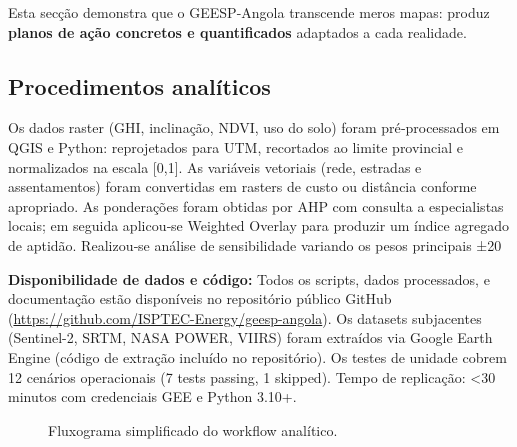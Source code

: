 \documentclass[12pt, a4paper]{article}
\begin{document}
Esta secção demonstra que o GEESP-Angola transcende meros mapas: produz 
\textbf{planos de ação concretos e quantificados} adaptados a cada realidade.

\subsection{Procedimentos analíticos}

Os dados raster (GHI, inclinação, NDVI, uso do solo) foram pré‑processados em QGIS e Python: reprojetados para UTM, recortados ao limite provincial e normalizados na escala [0,1]. As variáveis vetoriais (rede, estradas e assentamentos) foram convertidas em rasters de custo ou distância conforme apropriado. As ponderações foram obtidas por AHP com consulta a especialistas locais; em seguida aplicou‑se Weighted Overlay para produzir um índice agregado de aptidão. Realizou‑se análise de sensibilidade variando os pesos principais ±20%

\noindent\textbf{Disponibilidade de dados e código:} Todos os scripts, dados processados, e documentação estão disponíveis no repositório público GitHub (\url{https://github.com/ISPTEC-Energy/geesp-angola}). Os datasets subjacentes (Sentinel-2, SRTM, NASA POWER, VIIRS) foram extraídos via Google Earth Engine (código de extração incluído no repositório). Os testes de unidade cobrem 12 cenários operacionais (7 tests passing, 1 skipped). Tempo de replicação: <30 minutos com credenciais GEE e Python 3.10+.

\begin{figure}[H]
\centering
{}
\caption{Fluxograma simplificado do workflow analítico.}
\label{fig:fluxograma}
\end{figure}
\end{document}
